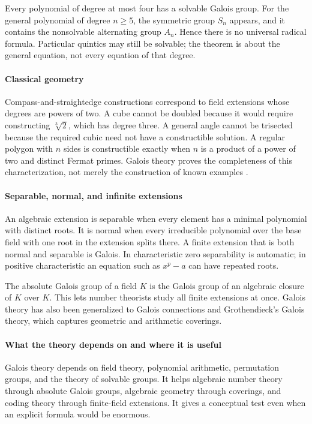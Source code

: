 Every polynomial of degree at most four has a solvable Galois group. For the general polynomial of degree $n\geq5$, the symmetric group $S_n$ appears, and it contains the nonsolvable alternating group $A_n$. Hence there is no universal radical formula. Particular quintics may still be solvable; the theorem is about the general equation, not every equation of that degree.

\paragraph{Classical geometry}
Compass-and-straightedge constructions correspond to field extensions whose degrees are powers of two. A cube cannot be doubled because it would require constructing $\sqrt[3]{2}$, which has degree three. A general angle cannot be trisected because the required cubic need not have a constructible solution. A regular polygon with $n$ sides is constructible exactly when $n$ is a product of a power of two and distinct Fermat primes. Galois theory proves the completeness of this characterization, not merely the construction of known examples \cite{galois_theory_ref3}.

\paragraph{Separable, normal, and infinite extensions}
An algebraic extension is separable when every element has a minimal polynomial with distinct roots. It is normal when every irreducible polynomial over the base field with one root in the extension splits there. A finite extension that is both normal and separable is Galois. In characteristic zero separability is automatic; in positive characteristic an equation such as $x^p-a$ can have repeated roots.

The absolute Galois group of a field $K$ is the Galois group of an algebraic closure of $K$ over $K$. This lets number theorists study all finite extensions at once. Galois theory has also been generalized to Galois connections and Grothendieck's Galois theory, which captures geometric and arithmetic coverings.

\paragraph{What the theory depends on and where it is useful}
Galois theory depends on field theory, polynomial arithmetic, permutation groups, and the theory of solvable groups. It helps algebraic number theory through absolute Galois groups, algebraic geometry through coverings, and coding theory through finite-field extensions. It gives a conceptual test even when an explicit formula would be enormous.

